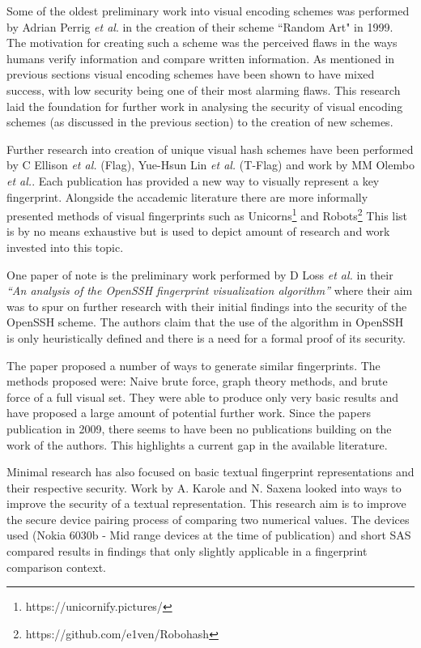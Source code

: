 Some of the oldest preliminary work into visual encoding schemes was performed by Adrian Perrig \textit{et al}\cite{perrig1999hash}. in the creation of their scheme ``Random Art" in 1999. The motivation for creating such a scheme was the perceived flaws in the ways humans verify information and compare written information. As mentioned in previous sections visual encoding schemes have been shown to have mixed success, with low security being one of their most alarming flaws. This research laid the foundation for further work in analysing the security of visual encoding schemes (as discussed in the previous section) to the creation of new schemes.

Further research into creation of unique visual hash schemes have been performed by C Ellison \textit{et al.} \cite{ellison2003public} (Flag), Yue-Hsun Lin \textit{et al.}\cite{lin2010spate} (T-Flag) and work by MM Olembo \textit{et al.}\cite{olembo2013developing}. Each publication has provided a new way to visually represent a key fingerprint. Alongside the accademic literature there are more informally presented methods of visual fingerprints such as Unicorns\footnote{https://unicornify.pictures/} and Robots\footnote{https://github.com/e1ven/Robohash} This list is by no means exhaustive but is used to depict amount of research and work invested into this topic.

One paper of note is the preliminary work performed by D Loss \textit{et al.}\cite{loss2009drunken} in their \textit{``An analysis of the OpenSSH fingerprint visualization algorithm''} where their aim was to spur on further research with their initial findings into the security of the OpenSSH scheme. The authors claim that the use of the algorithm in OpenSSH is only heuristically defined and there is a need for a formal proof of its security. 

The paper proposed a number of ways to generate similar fingerprints. The methods proposed were: Naive brute force, graph theory methods, and brute force of a full visual set. They were able to produce only very basic results and have proposed a large amount of potential further work. Since the papers publication in 2009, there seems to have been no publications building on the work of the authors. This highlights a current gap in the available literature.

Minimal research has also focused on basic textual fingerprint representations and their respective security. Work by A. Karole and N. Saxena\cite{karole2009improving} looked into ways to improve the security of a textual representation. This research aim is to improve the secure device pairing process of comparing two numerical values. The devices used (Nokia 6030b - Mid range devices at the time of publication) and short SAS compared results in findings that only slightly applicable in a fingerprint comparison context. 

